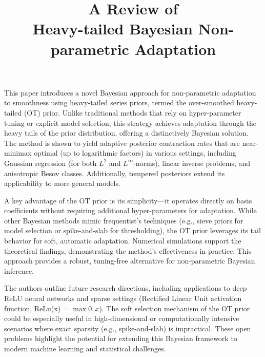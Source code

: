 \documentclass[11pt]{article}
\title{A Review of \\ Heavy-tailed Bayesian Non-parametric Adaptation}
\begin{document}
	\maketitle	
	

This paper introduces a novel Bayesian approach for non-parametric adaptation to smoothness using heavy-tailed series priors, termed the over-smoothed heavy-tailed (OT) prior. Unlike traditional methods that rely on hyper-parameter tuning or explicit model selection, this strategy achieves adaptation through the heavy tails of the prior distribution, offering a distinctively Bayesian solution. The method is shown to yield adaptive posterior contraction rates that are near-minimax optimal (up to logarithmic factors) in various settings, including Gaussian regression (for both $L^2$ and $L^\infty$-norms), linear inverse problems, and anisotropic Besov classes. Additionally, tempered posteriors extend its applicability to more general models.

A key advantage of the OT prior is its simplicity—it operates directly on basis coefficients without requiring additional hyper-parameters for adaptation. While other Bayesian methods mimic frequentist's techniques (e.g., sieve priors for model selection or spike-and-slab for thresholding), the OT prior leverages its tail behavior for soft, automatic adaptation. Numerical simulations support the theoretical findings, demonstrating the method’s effectiveness in practice. This approach provides a robust, tuning-free alternative for non-parametric Bayesian inference.

The authors outline future research directions, including applications to deep ReLU neural networks and sparse settings (Rectified Linear Unit activation function, ReLu(x) = $\max{0, x}$). The soft selection mechanism of the OT prior could be especially useful in high-dimensional or computationally intensive scenarios where exact sparsity (e.g., spike-and-slab) is impractical. These open problems highlight the potential for extending this Bayesian framework to modern machine learning and statistical challenges.
\end{document}
